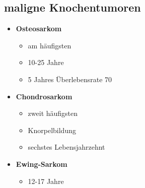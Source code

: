 \subsection{maligne Knochentumoren}
	\begin{itemize}
		\item \textbf{Osteosarkom}
			\begin{itemize}
				\item am häufigsten
				\item 10-25 Jahre
				\item 5 Jahres Überlebensrate 70%
			\end{itemize}
		\item \textbf{Chondrosarkom}
			\begin{itemize}
				\item zweit häufigsten
				\item Knorpelbildung
				\item sechstes Lebensjahrzehnt
			\end{itemize}
		\item \textbf{Ewing-Sarkom}
			\begin{itemize}
				\item 12-17 Jahre
			\end{itemize}
 	\end{itemize}